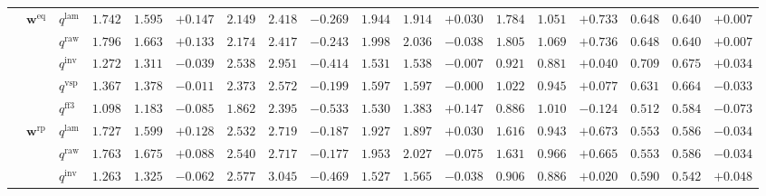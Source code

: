 \documentclass[eng]{kjas3}
\begin{document}
\begin{table}[t]
{\begin{tabular}{lll ccc ccc ccc ccc ccc}
\cmidrule(lr){2-18}
 & $\mathbf{w}^{\mathrm{eq}}$ & $q^{\mathrm{lam}}$ & $1.742$ & $1.595$ & \cellcolor{posgreen!50}$+0.147$ & $2.149$ & $2.418$ & \cellcolor{negred!50}$-0.269$ & $1.944$ & $1.914$ & \cellcolor{posgreen!50}$+0.030$ & $1.784$ & $1.051$ & \cellcolor{posgreen!50}$+0.733$ & $0.648$ & $0.640$ & \cellcolor{posgreen!50}$+0.007$ \\
 &  & $q^{\mathrm{raw}}$ & $1.796$ & $1.663$ & \cellcolor{posgreen!50}$+0.133$ & $2.174$ & $2.417$ & \cellcolor{negred!50}$-0.243$ & $1.998$ & $2.036$ & \cellcolor{negred!50}$-0.038$ & $1.805$ & $1.069$ & \cellcolor{posgreen!50}$+0.736$ & $0.648$ & $0.640$ & \cellcolor{posgreen!50}$+0.007$ \\
 &  & $q^{\mathrm{inv}}$ & $1.272$ & $1.311$ & \cellcolor{negred!50}$-0.039$ & $2.538$ & $2.951$ & \cellcolor{negred!50}$-0.414$ & $1.531$ & $1.538$ & \cellcolor{negred!50}$-0.007$ & $0.921$ & $0.881$ & \cellcolor{posgreen!50}$+0.040$ & $0.709$ & $0.675$ & \cellcolor{posgreen!50}$+0.034$ \\
 &  & $q^{\mathrm{vsp}}$ & $1.367$ & $1.378$ & \cellcolor{negred!50}$-0.011$ & $2.373$ & $2.572$ & \cellcolor{negred!50}$-0.199$ & $1.597$ & $1.597$ & $-0.000$ & $1.022$ & $0.945$ & \cellcolor{posgreen!50}$+0.077$ & $0.631$ & $0.664$ & \cellcolor{negred!50}$-0.033$ \\
 &  & $q^{\mathrm{ff3}}$ & $1.098$ & $1.183$ & \cellcolor{negred!50}$-0.085$ & $1.862$ & $2.395$ & \cellcolor{negred!50}$-0.533$ & $1.530$ & $1.383$ & \cellcolor{posgreen!50}$+0.147$ & $0.886$ & $1.010$ & \cellcolor{negred!50}$-0.124$ & $0.512$ & $0.584$ & \cellcolor{negred!50}$-0.073$ \\
\cmidrule(lr){2-18}
 & $\mathbf{w}^{\mathrm{rp}}$ & $q^{\mathrm{lam}}$ & $1.727$ & $1.599$ & \cellcolor{posgreen!50}$+0.128$ & $2.532$ & $2.719$ & \cellcolor{negred!50}$-0.187$ & $1.927$ & $1.897$ & \cellcolor{posgreen!50}$+0.030$ & $1.616$ & $0.943$ & \cellcolor{posgreen!50}$+0.673$ & $0.553$ & $0.586$ & \cellcolor{negred!50}$-0.034$ \\
 &  & $q^{\mathrm{raw}}$ & $1.763$ & $1.675$ & \cellcolor{posgreen!50}$+0.088$ & $2.540$ & $2.717$ & \cellcolor{negred!50}$-0.177$ & $1.953$ & $2.027$ & \cellcolor{negred!50}$-0.075$ & $1.631$ & $0.966$ & \cellcolor{posgreen!50}$+0.665$ & $0.553$ & $0.586$ & \cellcolor{negred!50}$-0.034$ \\
 &  & $q^{\mathrm{inv}}$ & $1.263$ & $1.325$ & \cellcolor{negred!50}$-0.062$ & $2.577$ & $3.045$ & \cellcolor{negred!50}$-0.469$ & $1.527$ & $1.565$ & \cellcolor{negred!50}$-0.038$ & $0.906$ & $0.886$ & \cellcolor{posgreen!50}$+0.020$ & $0.590$ & $0.542$ & \cellcolor{posgreen!50}$+0.048$ \\

\end{tabular}}
\end{table}
\end{document}
